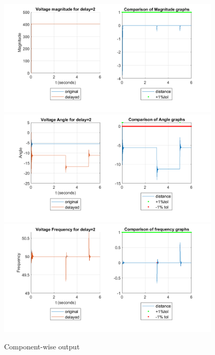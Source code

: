      \begin{figure}
        \caption{Component-wise output}
 
    \includegraphics[width=0.95\textwidth]{figures/v_MagFig-DelayOf_2-Ascending.png}    
         \label{fig:AscMag}
   \includegraphics[width=0.95\textwidth]{figures/v_AngFig-DelayOf_2-Ascending.png}    
         \label{fig:AscAng}
   \includegraphics[width=0.95\textwidth]{figures/v_FreqFig-DelayOf_2-Ascending.png}    
         \label{fig:AscFreq}
 
\end{figure}















